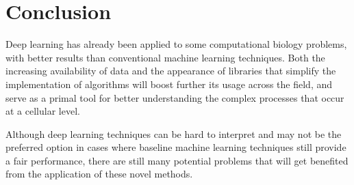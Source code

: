 \documentclass[journal]{IEEEtran}
\begin{document}
%




\section{Conclusion}

Deep learning has already been applied to some computational biology problems, with better results than conventional machine learning techniques. Both the increasing availability of data and the appearance of libraries that simplify the implementation of algorithms will boost further its usage across the field, and serve as a primal tool for better understanding the complex processes that occur at a cellular level.

Although deep learning techniques can be hard to interpret and may not be the preferred option in cases where baseline machine learning techniques still provide a fair performance, there are still many potential problems that will get benefited from the application of these novel methods.


\ifCLASSOPTIONcaptionsoff
  \newpage
\fi



\end{document}
